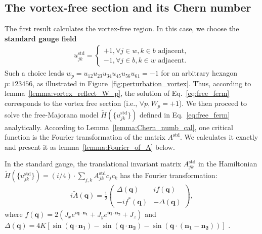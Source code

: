 \subsection{The vortex-free section and its Chern number}
The first result calculates the vortex-free region. In this case, we choose the \textbf{standard gauge field} 
\begin{align}
    u^{\mathrm{std}}_{jk} =\begin{cases}
         +1,  \forall j\in w,k\in b \text{~adjacent}, \\
          -1,  \forall j\in b,k\in w \text{~adjacent}.
    \end{cases}
\end{align}
Such a choice leads $w_p = u_{12}u_{23}u_{34}u_{45}u_{56}u_{61} = -1$ for an arbitrary hexagon $p:123456$, as illustrated in Figure~\ref{fig:perturbation_vortex}. 
Thus, according to lemma~\ref{lemma:vortex_reflect_W_p}, the solution of Eq.~\eqref{eq:free_ferm} corresponds to the vortex free section (i.e., $\forall p, W_p = +1$).
We then proceed to solve the free-Majorana model $\tilde H(\{u^{\mathrm{std}}_{jk}\})$ defined in Eq.~\eqref{eq:free_ferm} analytically.
According to Lemma~\ref{lemma:Chern_numb_cal}, one critical function is the Fourier transformation of the matrix $A^{\mathrm{std}}$. We calculates it exactly and present it as lemma~\ref{lemma:Fourier_of_A} below.
\begin{lemma}\label{lemma:Fourier_of_A}
In the standard gauge, the translational invariant matrix $ A_{jk}^{\mathrm{std}}$ in the Hamiltonian  $\tilde H(\{u^{\mathrm{std}}_{jk}\}) = ({i}/{4})\cdot \sum_{j,k} A_{jk}^{\mathrm{std}} c_j c_k$  has the Fourier transformation:
\begin{align}
    i\tilde A(\mathbf{q}) =\frac{1}{2}\begin{pmatrix}\Delta(\mathbf{q})&if(\mathbf{q}) \\ -if^*(\mathbf{q})&-\Delta(\mathbf{q})\end{pmatrix},
\end{align}
where $f(\mathbf q) = 2(J_x e^{i \mathbf q \cdot \mathbf{n_1}} + J_y e^{i \mathbf q \cdot \mathbf{n_2}} + J_z)$ and $\Delta(\mathbf{q}) = 4K \left[\sin(\mathbf q \cdot\mathbf{n_1}) - \sin(\mathbf q \cdot\mathbf{n_2}) - \sin(\mathbf q \cdot (\mathbf{n_1} - \mathbf{n_2}))\right] $ .
\end{lemma}
